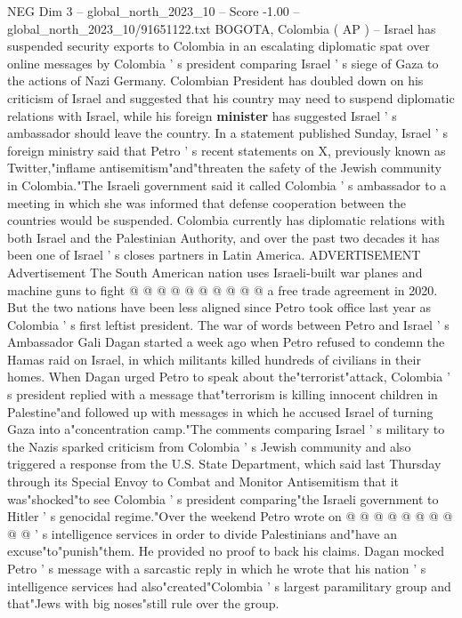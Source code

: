 \begin{textsample}{NEG Dim 3 – global\_north\_2023\_10 – Score -1.00 – global\_north\_2023\_10/91651122.txt}  \label{ex:f3_neg_258}
BOGOTA, Colombia ( AP ) -- Israel has suspended security exports to Colombia in an escalating diplomatic spat over online messages by Colombia ' s president comparing Israel ' s siege of Gaza to the actions of Nazi Germany.
Colombian President has doubled down on his criticism of Israel and suggested that his country may need to suspend diplomatic relations with Israel, while his foreign \textbf{minister} has suggested Israel ' s ambassador should leave the country.
In a statement published Sunday, Israel ' s foreign ministry said that Petro ' s recent statements on X, previously known as Twitter,"inflame antisemitism"and"threaten the safety of the Jewish community in Colombia."The Israeli government said it called Colombia ' s ambassador to a meeting in which she was informed that defense cooperation between the countries would be suspended.
Colombia currently has diplomatic relations with both Israel and the Palestinian Authority, and over the past two decades it has been one of Israel ' s closes partners in Latin America.
ADVERTISEMENT Advertisement The South American nation uses Israeli-built war planes and machine guns to fight @ @ @ @ @ @ @ @ @ @ a free trade agreement in 2020.
But the two nations have been less aligned since Petro took office last year as Colombia ' s first leftist president.
The war of words between Petro and Israel ' s Ambassador Gali Dagan started a week ago when Petro refused to condemn the Hamas raid on Israel, in which militants killed hundreds of civilians in their homes.
When Dagan urged Petro to speak about the"terrorist"attack, Colombia ' s president replied with a message that"terrorism is killing innocent children in Palestine"and followed up with messages in which he accused Israel of turning Gaza into a"concentration camp."The comments comparing Israel ' s military to the Nazis sparked criticism from Colombia ' s Jewish community and also triggered a response from the U.S.
State Department, which said last Thursday through its Special Envoy to Combat and Monitor Antisemitism that it was"shocked"to see Colombia ' s president comparing"the Israeli government to Hitler ' s genocidal regime."Over the weekend Petro wrote on @ @ @ @ @ @ @ @ @ @ ' s intelligence services in order to divide Palestinians and"have an excuse"to"punish"them.
He provided no proof to back his claims.
Dagan mocked Petro ' s message with a sarcastic reply in which he wrote that his nation ' s intelligence services had also"created"Colombia ' s largest paramilitary group and that"Jews with big noses"still rule over the group.

\end{textsample}
